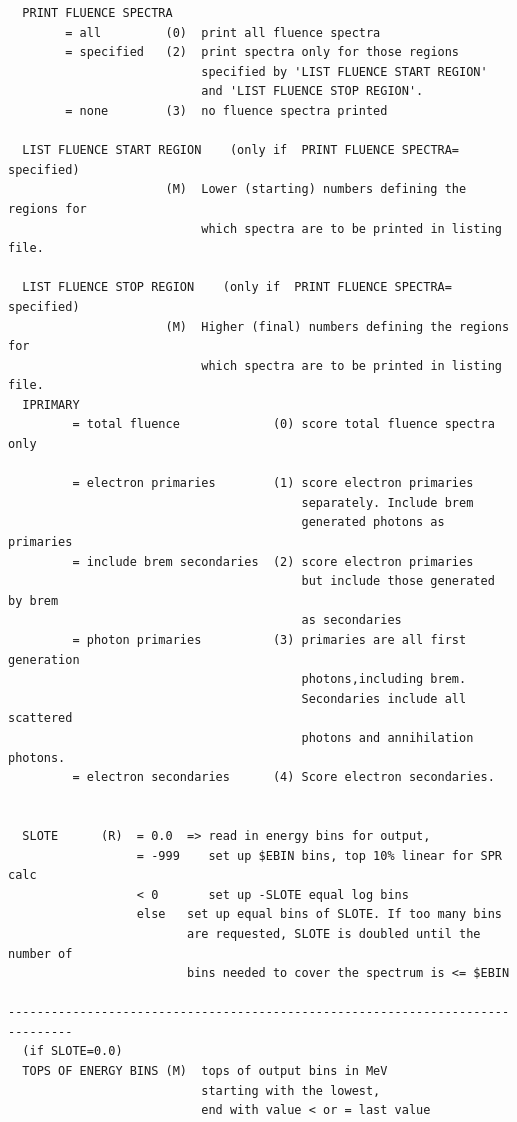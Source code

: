 \documentclass[12pt,twoside]{article}  %
\begin{document}
\begin{verbatim}
  PRINT FLUENCE SPECTRA
        = all         (0)  print all fluence spectra
        = specified   (2)  print spectra only for those regions
                           specified by 'LIST FLUENCE START REGION'
                           and 'LIST FLUENCE STOP REGION'.
        = none        (3)  no fluence spectra printed

  LIST FLUENCE START REGION    (only if  PRINT FLUENCE SPECTRA= specified)
                      (M)  Lower (starting) numbers defining the regions for
                           which spectra are to be printed in listing file.

  LIST FLUENCE STOP REGION    (only if  PRINT FLUENCE SPECTRA= specified)
                      (M)  Higher (final) numbers defining the regions for
                           which spectra are to be printed in listing file.
  IPRIMARY
         = total fluence             (0) score total fluence spectra  only

         = electron primaries        (1) score electron primaries
                                         separately. Include brem
                                         generated photons as primaries
         = include brem secondaries  (2) score electron primaries
                                         but include those generated by brem
                                         as secondaries
         = photon primaries          (3) primaries are all first generation
                                         photons,including brem.
                                         Secondaries include all scattered
                                         photons and annihilation photons.
         = electron secondaries      (4) Score electron secondaries.


  SLOTE      (R)  = 0.0  => read in energy bins for output,
                  = -999    set up $EBIN bins, top 10% linear for SPR calc
                  < 0       set up -SLOTE equal log bins
                  else   set up equal bins of SLOTE. If too many bins
                         are requested, SLOTE is doubled until the number of
                         bins needed to cover the spectrum is <= $EBIN

-------------------------------------------------------------------------------
  (if SLOTE=0.0)
  TOPS OF ENERGY BINS (M)  tops of output bins in MeV
                           starting with the lowest,
                           end with value < or = last value
\end{verbatim}
\end{document}
